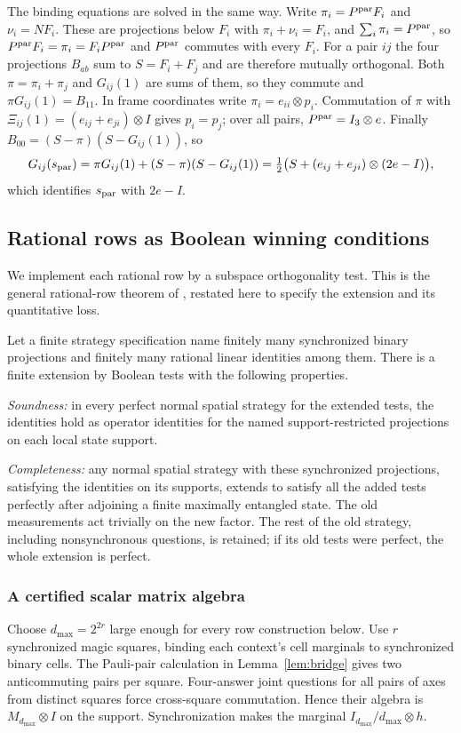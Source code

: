 The binding equations are solved in the same way. Write $\pi_i=P^{\rm par}F_i$ and $\nu_i=NF_i$. These are projections below $F_i$ with $\pi_i+\nu_i=F_i$, and $\sum_i\pi_i=P^{\rm par}$, so $P^{\rm par}F_i=\pi_i=F_iP^{\rm par}$ and $P^{\rm par}$ commutes with every $F_i$. For a pair $ij$ the four projections $B_{ab}$ sum to $S=F_i+F_j$ and are therefore mutually orthogonal. Both $\pi=\pi_i+\pi_j$ and $G_{ij}(1)$ are sums of them, so they commute and $\pi G_{ij}(1)=B_{11}$. In frame coordinates write $\pi_i=e_{ii}\otimes p_i$. Commutation of $\pi$ with $\Xi_{ij}(1)=(e_{ij}+e_{ji})\otimes I$ gives $p_i=p_j$; over all pairs, $P^{\rm par}=I_3\otimes e$. Finally $B_{00}=(S-\pi)(S-G_{ij}(1))$, so
\[
 G_{ij}(s_{\rm par})=\pi G_{ij}(1)+(S-\pi)(S-G_{ij}(1))=\tfrac12\bigl(S+(e_{ij}+e_{ji})\otimes(2e-I)\bigr),
\]
which identifies $s_{\rm par}$ with $2e-I$.

\subsection{Rational rows as Boolean winning conditions}\label{sec:rows}
We implement each rational row by a subspace orthogonality test. This is the general rational-row theorem of \cite[Theorem~B]{Entropy}, restated here to specify the extension and its quantitative loss.

\begin{lemma}\label{lem:rows}
Let a finite strategy specification name finitely many synchronized binary projections and finitely many rational linear identities among them. There is a finite extension by Boolean tests with the following properties.

\emph{Soundness:} in every perfect normal spatial strategy for the extended tests, the identities hold as operator identities for the named support-restricted projections on each local state support.

\emph{Completeness:} any normal spatial strategy with these synchronized projections, satisfying the identities on its supports, extends to satisfy all the added tests perfectly after adjoining a finite maximally entangled state. The old measurements act trivially on the new factor. The rest of the old strategy, including nonsynchronous questions, is retained; if its old tests were perfect, the whole extension is perfect.
\end{lemma}

\subsubsection{A certified scalar matrix algebra}
Choose $d_{\max}=2^{2r}$ large enough for every row construction below. Use $r$ synchronized magic squares, binding each context's cell marginals to synchronized binary cells. The Pauli-pair calculation in Lemma~\ref{lem:bridge} gives two anticommuting pairs per square. Four-answer joint questions for all pairs of axes from distinct squares force cross-square commutation. Hence their algebra is $M_{d_{\max}}\otimes I$ on the support. Synchronization makes the marginal $I_{d_{\max}}/d_{\max}\otimes h$.


